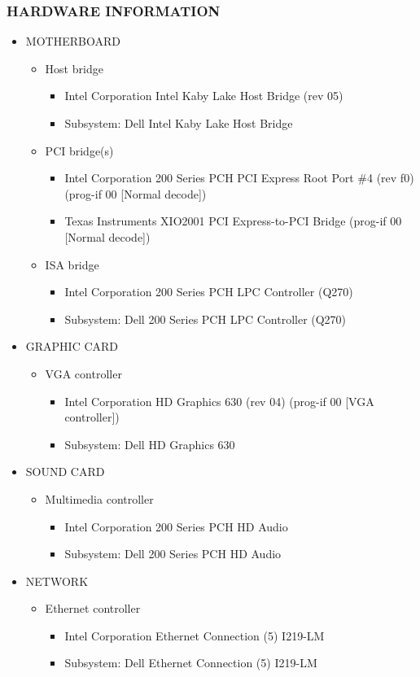 \documentclass[a4paper]{report}
\begin{document}
\subsubsection{HARDWARE INFORMATION}
\begin{itemize}
\item MOTHERBOARD
\begin{itemize} 
\item Host bridge
\begin{itemize}
\item Intel Corporation Intel Kaby Lake Host Bridge (rev 05)
\item Subsystem: Dell Intel Kaby Lake Host Bridge
\end{itemize}
\item
PCI bridge(s)
\begin{itemize}
\item Intel Corporation 200 Series PCH PCI Express Root Port \#4 (rev f0) (prog-if 00 [Normal decode])
\item Texas Instruments XIO2001 PCI Express-to-PCI Bridge (prog-if 00 [Normal decode])
\end{itemize}
\item ISA bridge
\begin{itemize}
\item Intel Corporation 200 Series PCH LPC Controller (Q270)
\item Subsystem: Dell 200 Series PCH LPC Controller (Q270)
\end{itemize}
\end{itemize}
\item GRAPHIC CARD
\begin{itemize}
\item VGA controller
\begin{itemize}
\item Intel Corporation HD Graphics 630 (rev 04) (prog-if 00 [VGA controller])
\item Subsystem: Dell HD Graphics 630
\end{itemize}
\end{itemize}
	
\item SOUND CARD
\begin{itemize}
\item Multimedia controller
\begin{itemize} 
\item Intel Corporation 200 Series PCH HD Audio
\item Subsystem: Dell 200 Series PCH HD Audio
\end{itemize}
\end{itemize}	
\item NETWORK
\begin{itemize}
\item Ethernet controller
\begin{itemize} 
\item Intel Corporation Ethernet Connection (5) I219-LM
\item Subsystem: Dell Ethernet Connection (5) I219-LM
\end{itemize}
\end{itemize}
\end{itemize}
\end{document}
